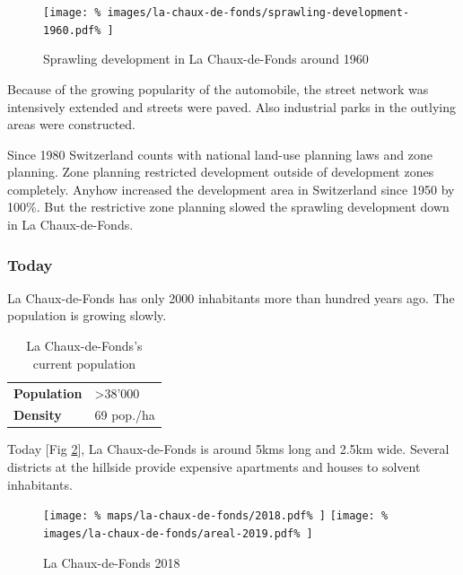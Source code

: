 \documentclass{article}
\begin{document}
\begin{multicols}{2}
			\begin{figure}[H]
				\texttt{[image: \%
					images/la-chaux-de-fonds/sprawling-development-1960.pdf\%
				]}
				\caption{Sprawling development in La Chaux-de-Fonds around 1960 \cite{MapGeoAdmin:LaChauxDeFonds}}
				\label{fig:map:la-chaux-de-fonds-sprawling-development-1960}
			\end{figure}
			
			
			
			Because of the growing popularity of the automobile, the street network was intensively extended and streets were paved.
			Also industrial parks in the outlying areas were constructed.
			
			Since 1980 Switzerland counts with national land-use planning laws and zone planning. Zone planning restricted development outside of development zones completely. Anyhow increased the development area in Switzerland since 1950 by 100\%.
			But the restrictive zone planning slowed the sprawling development down in La Chaux-de-Fonds.
			
			
			\subsubsection{Today}		
			
			La Chaux-de-Fonds has only 2000 inhabitants more than hundred years ago. The population is growing slowly.
			
			\begin{table}[H]			
				\centering
				\caption{La Chaux-de-Fonds's current population}
				\label{table:la-chaux-de-fonds-population}
				\begin{tabular}{|l|l|}
					\hline
					\textbf{Population}  & \textgreater 38'000 \\
					\textbf{Density}     & 69 pop./ha \\
					\hline
				\end{tabular}
			\end{table}
			
			Today [Fig \ref{fig:map:la-chaux-de-fonds-2018}], La Chaux-de-Fonds is around 5kms long and 2.5km wide. Several districts at the hillside provide expensive apartments and houses to solvent inhabitants.
			
			\begin{figure}[H]
				\texttt{[image: \%
					maps/la-chaux-de-fonds/2018.pdf\%
				]}
				\texttt{[image: \%
					images/la-chaux-de-fonds/areal-2019.pdf\%
				]}
				\caption{La Chaux-de-Fonds 2018  \cite{MapGeoAdmin:LaChauxDeFonds}}
				\label{fig:map:la-chaux-de-fonds-2018}
			\end{figure}
			

\end{multicols}
\end{document}
